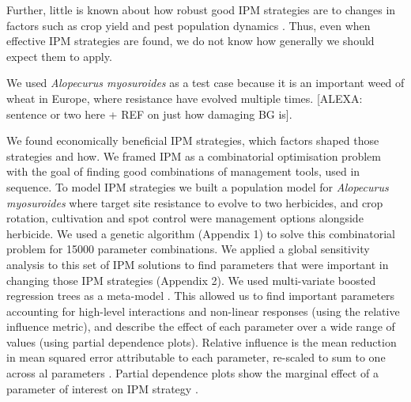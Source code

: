 \documentclass[12pt, a4paper]{article}
\begin{document}
Further, little is known about how robust good IPM strategies are to changes in factors such as crop yield and pest population dynamics \citep{EpanN2010}. Thus, even when effective IPM strategies are found, we do not know how generally we should expect them to apply.

We used \textit{Alopecurus myosuroides} as a test case because it is an important weed of wheat in Europe, where resistance have evolved multiple times. [ALEXA: sentence or two here + REF on just how damaging BG is].

We found economically beneficial IPM strategies, which factors shaped those strategies and how. We framed IPM as a combinatorial optimisation problem with the goal of finding good combinations of management tools, used in sequence. To model IPM strategies we built a population model for \textit{Alopecurus myosuroides} where target site resistance to evolve to two herbicides, and crop rotation, cultivation and spot control were management options alongside herbicide. We used a genetic algorithm (Appendix 1) to solve this combinatorial problem \citep{Tayl2004GA, Carr2010} for 15000 parameter combinations. We applied a global sensitivity analysis to this set of IPM solutions to find parameters that were important in changing those IPM strategies (Appendix 2). We used multi-variate boosted regression trees \citep{Mill2016} as a meta-model \citep{Cout2013}. This allowed us to find important parameters accounting for high-level interactions and non-linear responses (using the relative influence metric), and describe the effect of each parameter over a wide range of values (using partial dependence plots). Relative influence is the mean reduction in mean squared error attributable to each parameter, re-scaled to sum to one across al parameters \citep{Frie2001, Mill2016}. Partial dependence plots show the marginal effect of a parameter of interest on IPM strategy \citep{Frie2001, Mill2016}.         
\end{document}
